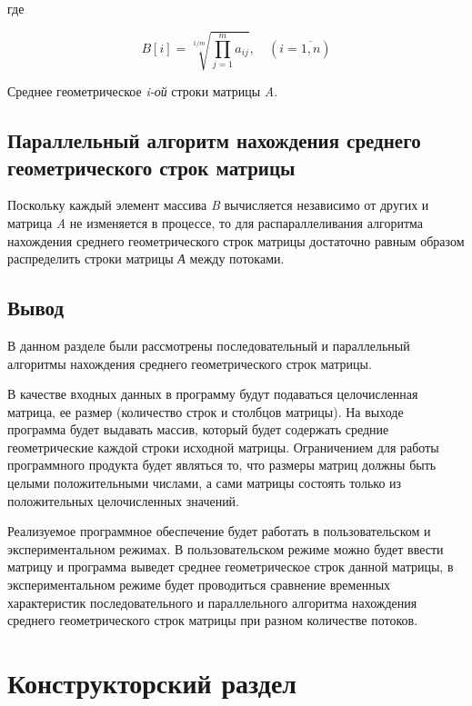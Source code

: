 где

\begin{equation}
    \displaystyle
    B[i] = \displaystyle\sqrt[1/m]{\prod_{j = 1}^{m} a_{ij}}, \quad (i = \overline{1, n})  
\end{equation}

Среднее геометрическое \textit{i-ой} строки матрицы \textit{A}.

\subsection{Параллельный алгоритм нахождения среднего геометрического строк матрицы}

Поскольку каждый элемент массива \textit{B} вычисляется независимо от других и матрица \textit{A} не изменяется в процессе, то для распараллеливания алгоритма нахождения среднего геометрического строк матрицы достаточно равным образом распределить строки матрицы \textit{А} между потоками.

\subsection{Вывод}

В данном разделе были рассмотрены последовательный и параллельный алгоритмы нахождения среднего геометрического строк матрицы. 

В качестве входных данных в программу будут подаваться целочисленная матрица, ее размер (количество строк и столбцов матрицы). На выходе программа будет выдавать массив, который будет содержать средние геометрические каждой строки исходной матрицы. Ограничением для работы программного продукта будет являться то, что размеры матриц должны быть целыми положительными числами, а сами матрицы состоять только из положительных целочисленных значений. 

Реализуемое программное обеспечение будет работать в пользовательском и экспериментальном режимах. В пользовательском режиме можно будет ввести матрицу и программа выведет среднее геометрическое строк данной матрицы, в экспериментальном режиме будет проводиться сравнение временных характеристик последовательного и параллельного алгоритма нахождения среднего геометрического строк матрицы при разном количестве потоков.

\section{Конструкторский раздел}

